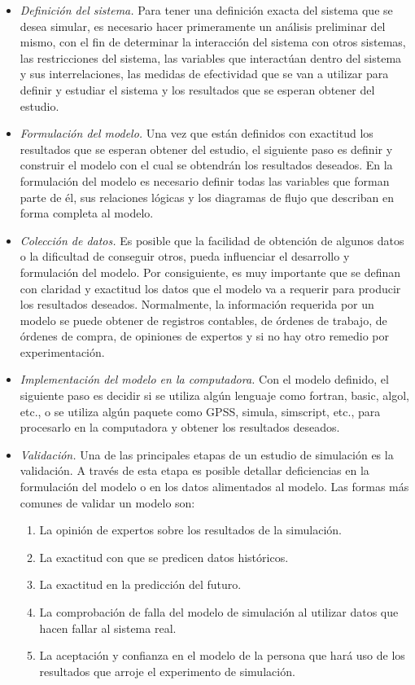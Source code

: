 \documentclass[11pt,letterpaper]{report}
\begin{document}
\begin{itemize}[leftmargin=*]
\item \emph{Definición del sistema.} Para tener una definición exacta
del sistema que se desea simular, es necesario hacer primeramente un
análisis preliminar del mismo, con el fin de determinar la interacción
del sistema con otros sistemas, las restricciones del sistema, las
variables que interactúan dentro del sistema y sus interrelaciones, las
medidas de efectividad que se van a utilizar para definir y estudiar el
sistema y los resultados que se esperan obtener del estudio.

\item \emph{Formulación del modelo.} Una vez que están definidos con
exactitud los resultados que se esperan obtener del estudio, el
siguiente paso es definir y construir el modelo con el cual se
obtendrán los resultados deseados. En la formulación del modelo es
necesario definir todas las variables que forman parte de él, sus
relaciones lógicas y los diagramas de flujo que describan en forma
completa al modelo.

\item \emph{Colección de datos.} Es posible que la facilidad de
obtención de algunos datos o la dificultad de conseguir otros, pueda
influenciar el desarrollo y formulación del modelo. Por consiguiente, es
muy importante que se definan con claridad y exactitud los datos que el
modelo va a requerir para producir los resultados deseados. Normalmente,
la información requerida por un modelo se puede obtener de registros
contables, de órdenes de trabajo, de órdenes de compra, de opiniones de
expertos y si no hay otro remedio por experimentación.

\item \emph{Implementación del modelo en la computadora.} Con el modelo
definido, el siguiente paso es decidir si se utiliza algún lenguaje como
fortran, basic, algol, etc., o se utiliza algún paquete como GPSS,
simula, simscript, etc., para procesarlo en la computadora y obtener los
resultados deseados.

\item \emph{Validación.} Una de las principales etapas de un estudio de
simulación es la validación. A través de esta etapa es posible detallar
deficiencias en la formulación del modelo o en los datos alimentados al
modelo. Las formas más comunes de validar un modelo son:

\begin{enumerate}
\item La opinión de expertos sobre los resultados de la simulación.
\item La exactitud con que se predicen datos históricos.
\item La exactitud en la predicción del futuro.
\item La comprobación de falla del modelo de simulación al utilizar
datos que hacen fallar al sistema real.
\item La aceptación y confianza en el modelo de la persona que hará
uso de los resultados que arroje el experimento de simulación.
\end{enumerate}


\end{itemize}
\end{document}
